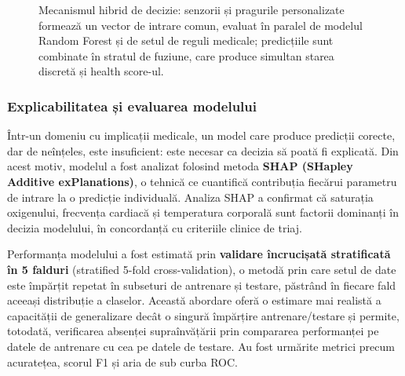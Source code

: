 ﻿\documentclass[12pt,a4paper,twoside]{article}
\begin{document}
\begin{figure}[H]
{}
\caption{Mecanismul hibrid de decizie: senzorii și pragurile personalizate formează un vector de intrare comun, evaluat în paralel de modelul Random Forest și de setul de reguli medicale; predicțiile sunt combinate în stratul de fuziune, care produce simultan starea discretă și health score-ul.}
\label{fig:hibrid-ai}
\end{figure}

\subsubsection{Explicabilitatea și evaluarea modelului}

Într-un domeniu cu implicații medicale, un model care produce predicții corecte, dar de neînțeles, este insuficient: este necesar ca decizia să poată fi explicată. Din acest motiv, modelul a fost analizat folosind metoda \textbf{SHAP (SHapley Additive exPlanations)}, o tehnică ce cuantifică contribuția fiecărui parametru de intrare la o predicție individuală. Analiza SHAP a confirmat că saturația oxigenului, frecvența cardiacă și temperatura corporală sunt factorii dominanți în decizia modelului, în concordanță cu criteriile clinice de triaj.

Performanța modelului a fost estimată prin \textbf{validare încrucișată stratificată în 5 falduri} (stratified 5-fold cross-validation), o metodă prin care setul de date este împărțit repetat în subseturi de antrenare și testare, păstrând în fiecare fald aceeași distribuție a claselor. Această abordare oferă o estimare mai realistă a capacității de generalizare decât o singură împărțire antrenare/testare și permite, totodată, verificarea absenței supraînvățării prin compararea performanței pe datele de antrenare cu cea pe datele de testare. Au fost urmărite metrici precum acuratețea, scorul F1 și aria de sub curba ROC.
\end{document}
